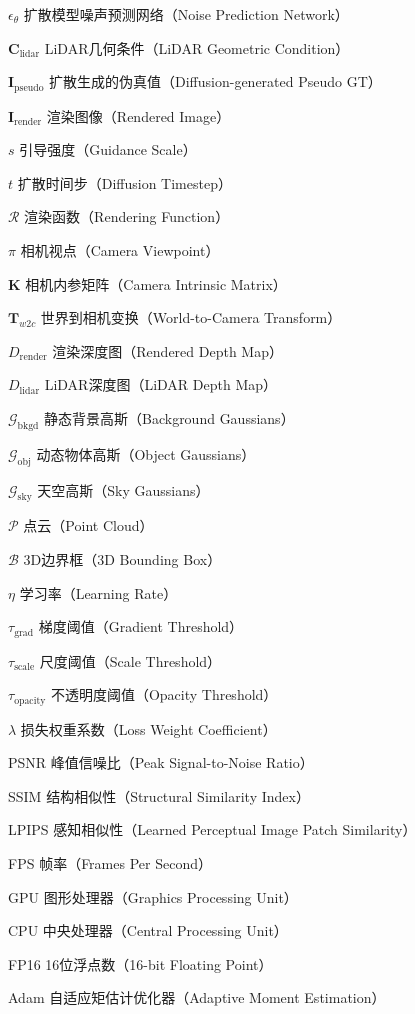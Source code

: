 \begin{denotation}[4cm]
  \item[$\epsilon_\theta$] 扩散模型噪声预测网络（Noise Prediction Network）
  \item[$\mathbf{C}_{\text{lidar}}$] LiDAR几何条件（LiDAR Geometric Condition）
  \item[$\mathbf{I}_{\text{pseudo}}$] 扩散生成的伪真值（Diffusion-generated Pseudo GT）
  \item[$\mathbf{I}_{\text{render}}$] 渲染图像（Rendered Image）
  \item[$s$] 引导强度（Guidance Scale）
  \item[$t$] 扩散时间步（Diffusion Timestep）
  
  \item[$\mathcal{R}$] 渲染函数（Rendering Function）
  \item[$\pi$] 相机视点（Camera Viewpoint）
  \item[$\mathbf{K}$] 相机内参矩阵（Camera Intrinsic Matrix）
  \item[$\mathbf{T}_{w2c}$] 世界到相机变换（World-to-Camera Transform）
  \item[$D_{\text{render}}$] 渲染深度图（Rendered Depth Map）
  \item[$D_{\text{lidar}}$] LiDAR深度图（LiDAR Depth Map）
  
  \item[$\mathcal{G}_{\text{bkgd}}$] 静态背景高斯（Background Gaussians）
  \item[$\mathcal{G}_{\text{obj}}$] 动态物体高斯（Object Gaussians）
  \item[$\mathcal{G}_{\text{sky}}$] 天空高斯（Sky Gaussians）
  \item[$\mathcal{P}$] 点云（Point Cloud）
  \item[$\mathcal{B}$] 3D边界框（3D Bounding Box）
  
  \item[$\eta$] 学习率（Learning Rate）
  \item[$\tau_{\text{grad}}$] 梯度阈值（Gradient Threshold）
  \item[$\tau_{\text{scale}}$] 尺度阈值（Scale Threshold）
  \item[$\tau_{\text{opacity}}$] 不透明度阈值（Opacity Threshold）
  \item[$\lambda$] 损失权重系数（Loss Weight Coefficient）
  
  \item[PSNR] 峰值信噪比（Peak Signal-to-Noise Ratio）
  \item[SSIM] 结构相似性（Structural Similarity Index）
  \item[LPIPS] 感知相似性（Learned Perceptual Image Patch Similarity）
  \item[FPS] 帧率（Frames Per Second）
  
  \item[GPU] 图形处理器（Graphics Processing Unit）
  \item[CPU] 中央处理器（Central Processing Unit）
  \item[FP16] 16位浮点数（16-bit Floating Point）
  \item[Adam] 自适应矩估计优化器（Adaptive Moment Estimation）
\end{denotation}

